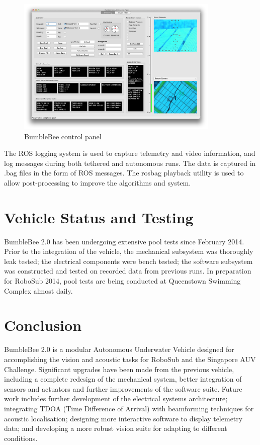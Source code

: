 \documentclass[journal,12pt]{IEEEtran}
\begin{document}
\begin{figure}[h]
\centering
\includegraphics[width=3.8in]{telemetry.png}
\caption{BumbleBee control panel}
\captionsetup{justification=centering}
\end{figure}

The ROS logging system is used to capture telemetry and video information, and log messages during both tethered and autonomous runs. The data is captured in .bag files in the form of ROS messages. The rosbag playback utility is used to allow post-processing to improve the algorithms and system.

\section{Vehicle Status and Testing}
BumbleBee 2.0 has been undergoing extensive pool tests since February 2014. Prior to the integration of the vehicle, the mechanical subsystem was thoroughly leak tested; the electrical components were bench tested; the software subsystem was constructed and tested on recorded data from previous runs. In preparation for RoboSub 2014, pool tests are being conducted at Queenstown Swimming Complex almost daily.

\section{Conclusion}
BumbleBee 2.0 is a modular Autonomous Underwater Vehicle designed for accomplishing the vision and acoustic tasks for RoboSub and the Singapore AUV Challenge. Significant upgrades have been made from the previous vehicle, including a complete redesign of the mechanical system, better integration of sensors and actuators and further improvements of the software suite. Future work includes further development of the electrical systems architecture; integrating TDOA (Time Difference of Arrival) with beamforming techniques for acoustic localisation; designing more interactive software to display telemetry data; and developing a more robust vision suite for adapting to different conditions. \\
\end{document}
